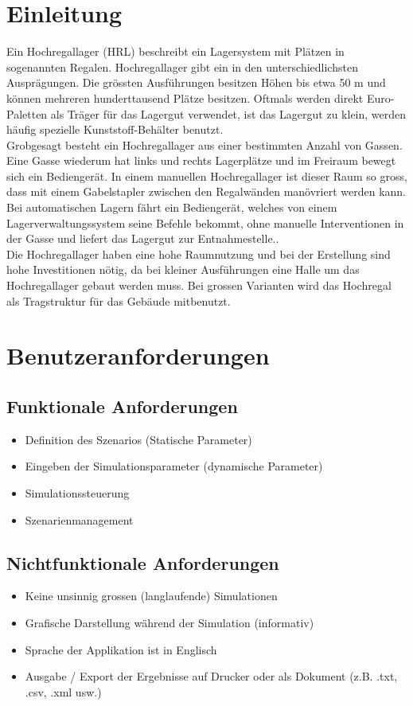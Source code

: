 \documentclass[11pt,a4paper]{article}
\begin{document}
\section{Einleitung}
Ein Hochregallager (HRL) beschreibt ein Lagersystem mit Plätzen in sogenannten Regalen. Hochregallager gibt ein in den unterschiedlichsten Ausprägungen. Die grössten Ausführungen besitzen Höhen bis etwa 50 m und können mehreren hunderttausend Plätze besitzen. Oftmals werden direkt Euro-Paletten als Träger für das Lagergut verwendet, ist das Lagergut zu klein, werden häufig spezielle Kunststoff-Behälter benutzt.\\
Grobgesagt besteht ein Hochregallager aus einer bestimmten Anzahl von Gassen. Eine Gasse wiederum hat links und rechts Lagerplätze und im Freiraum bewegt sich ein Bediengerät. In einem manuellen Hochregallager ist dieser Raum so gross, dass mit einem Gabelstapler zwischen den Regalwänden manövriert werden kann. Bei automatischen Lagern fährt ein Bediengerät, welches von einem Lagerverwaltungssystem seine Befehle bekommt, ohne manuelle Interventionen in der Gasse und liefert das Lagergut zur Entnahmestelle..\\
Die Hochregallager haben eine hohe Raumnutzung und bei der Erstellung sind hohe Investitionen nötig, da bei kleiner Ausführungen eine Halle um das Hochregallager gebaut werden muss. Bei grossen Varianten wird das Hochregal als Tragstruktur für das Gebäude mitbenutzt. 
%
\section{Benutzeranforderungen}
%
\subsection{Funktionale Anforderungen}
\begin{itemize}
  \item Definition des Szenarios (Statische Parameter)
  \item Eingeben der Simulationsparameter (dynamische Parameter)
  \item Simulationssteuerung
  \item Szenarienmanagement
\end{itemize}
%
\subsection{Nichtfunktionale Anforderungen}
\begin{itemize}
  \item Keine unsinnig grossen (langlaufende) Simulationen
  \item Grafische Darstellung während der Simulation (informativ)
  \item Sprache der Applikation ist in Englisch
  \item Ausgabe / Export der Ergebnisse auf Drucker oder als Dokument (z.B. .txt, .csv, .xml usw.)
\end{itemize}
\end{document}
